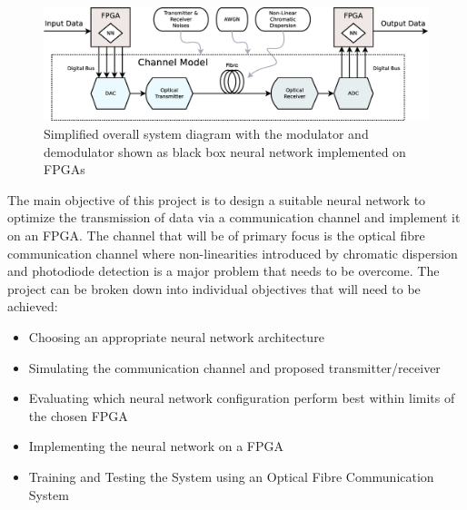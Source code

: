 \begin{figure}[H]
	\centering
	\includegraphics[width=\linewidth]{graphics/overall_diagram2.eps}
	\caption{Simplified overall system diagram with the modulator and demodulator shown as black box neural network implemented on FPGAs}
	\label{fig:overall}	
\end{figure}

The main objective of this project is to design a suitable neural network to optimize the transmission of data via a communication channel and implement it on an FPGA. The channel that will be of primary focus is the optical fibre communication channel where non-linearities introduced by chromatic dispersion and photodiode detection is a major problem that needs to be overcome. The project can be broken down into individual objectives that will need to be achieved:

\begin{itemize}
    \item Choosing an appropriate neural network architecture
    \item Simulating the communication channel and proposed transmitter/receiver
    \item Evaluating which neural network configuration perform best within limits of the chosen FPGA
    \item Implementing the neural network on a FPGA
    \item Training and Testing the System using an Optical Fibre Communication System
\end{itemize}

